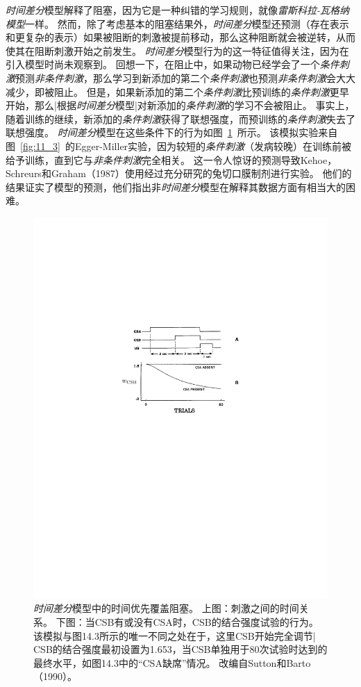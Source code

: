 {	
\textit{时间差分}模型解释了阻塞，因为它是一种纠错的学习规则，就像\textit{雷斯科拉-瓦格纳模型}一样。
然而，除了考虑基本的阻塞结果外，\textit{时间差分}模型还预测（存在表示和更复杂的表示）如果被阻断的刺激被提前移动，那么这种阻断就会被逆转，从而使其在阻断刺激开始之前发生。
\textit{时间差分}模型行为的这一特征值得关注，因为在引入模型时尚未观察到。
回想一下，在阻止中，如果动物已经学会了一个\textit{条件刺激}预测\textit{非条件刺激}，那么学习到新添加的第二个\textit{条件刺激}也预测\textit{非条件刺激}会大大减少，即被阻止。
但是，如果新添加的第二个\textit{条件刺激}比预训练的\textit{条件刺激}更早开始，那么|根据\textit{时间差分}模型|对新添加的\textit{条件刺激}的学习不会被阻止。
事实上，随着训练的继续，新添加的\textit{条件刺激}获得了联想强度，而预训练的\textit{条件刺激}失去了联想强度。
\textit{时间差分}模型在这些条件下的行为如图~\ref{fig:11_4}~所示。
该模拟实验来自图~\ref{fig:11_3}~的Egger-Miller实验，因为较短的\textit{条件刺激}（发病较晚）在训练前被给予训练，直到它与\textit{非条件刺激}完全相关。
这一令人惊讶的预测导致Kehoe，Schreurs和Graham（1987）使用经过充分研究的兔切口膜制剂进行实验。
他们的结果证实了模型的预测，他们指出非\textit{时间差分}模型在解释其数据方面有相当大的困难。


\begin{figure}[!htb]
	\centering
	\includegraphics[width=0.5\linewidth]{chap11/fig_11_4}
	\caption{\textit{时间差分}模型中的时间优先覆盖阻塞。
		上图：刺激之间的时间关系。
		下图：当CSB有或没有CSA时，CSB的结合强度试验的行为。
		该模拟与图14.3所示的唯一不同之处在于，这里CSB开始完全调节| CSB的结合强度最初设置为1.653，当CSB单独用于80次试验时达到的最终水平，如图14.3中的“CSA缺席”情况。
		改编自Sutton和Barto（1990）。 \label{fig:11_4}}
\end{figure}


}
